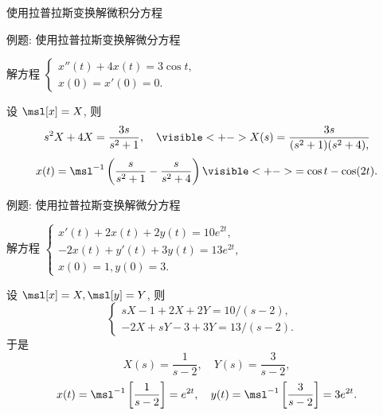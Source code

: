 \begin{frame}{使用拉普拉斯变换解微积分方程}
\begin{center}
\end{center}
\end{frame}


\begin{frame}{例题: 使用拉普拉斯变换解微分方程}
\begin{example}
解方程 
  $\begin{cases}
    x''(t)+4x(t)=3\cos t,& \\
    x(0)=x'(0)=0.&
  \end{cases}$
\end{example}
\begin{solution}
设 $\msl[x]=X$,
\onslide<+->
则
\[s^2X+4X=\frac{3s}{s^2+1},\quad
\visible<+->{X(s)=\frac{3s}{(s^2+1)(s^2+4),}}\]
\onslide<+->
\vspace{-\baselineskip}
\[x(t)=\msl^{-1}\left(\frac{s}{s^2+1}-\frac{s}{s^2+4}\right)
\visible<+->{=\cos t-\cos(2t).}\]
\end{solution}
\end{frame}


\begin{frame}{例题: 使用拉普拉斯变换解微分方程}
\beqskip{0pt}
\begin{example}
解方程 
  $\begin{cases}
    x'(t)+2x(t)+2y(t)=10e^{2t},& \\
    -2x(t)+y'(t)+3y(t)=13e^{2t},& \\
    x(0)=1,y(0)=3.&
  \end{cases}$
\end{example}
\vspace{-7pt}
\begin{solution}
设 $\msl[x]=X,\msl[y]=Y$,
\onslide<+->
则
  \[\begin{cases}
    sX-1+2X+2Y=10/(s-2),& \\
    -2X+sY-3+3Y=13/(s-2).&
  \end{cases}\]
\onslide<+->
于是
\[X(s)=\frac1{s-2},\quad Y(s)=\frac3{s-2},\]
\onslide<+->
\[x(t)=\msl^{-1}\left[\frac1{s-2}\right]=e^{2t},\quad
y(t)=\msl^{-1}\left[\frac3{s-2}\right]=3e^{2t}.\]
\end{solution}
\endgroup
\end{frame}


